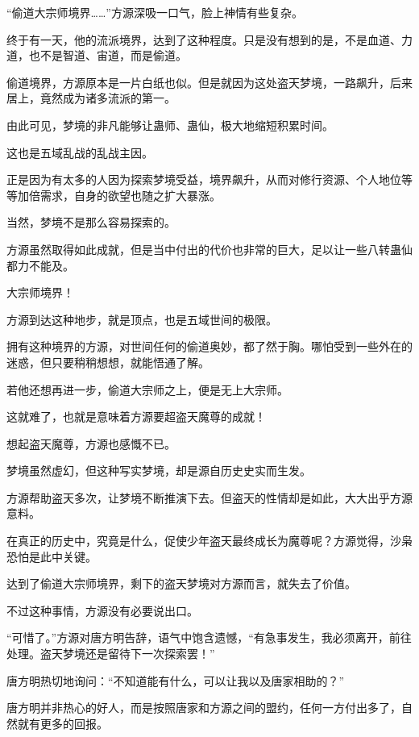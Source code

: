 
\begin{this_body}

“偷道大宗师境界……”方源深吸一口气，脸上神情有些复杂。

终于有一天，他的流派境界，达到了这种程度。只是没有想到的是，不是血道、力道，也不是智道、宙道，而是偷道。

偷道境界，方源原本是一片白纸也似。但是就因为这处盗天梦境，一路飙升，后来居上，竟然成为诸多流派的第一。

由此可见，梦境的非凡能够让蛊师、蛊仙，极大地缩短积累时间。

这也是五域乱战的乱战主因。

正是因为有太多的人因为探索梦境受益，境界飙升，从而对修行资源、个人地位等等加倍需求，自身的欲望也随之扩大暴涨。

当然，梦境不是那么容易探索的。

方源虽然取得如此成就，但是当中付出的代价也非常的巨大，足以让一些八转蛊仙都力不能及。

大宗师境界！

方源到达这种地步，就是顶点，也是五域世间的极限。

拥有这种境界的方源，对世间任何的偷道奥妙，都了然于胸。哪怕受到一些外在的迷惑，但只要稍稍想想，就能悟通了解。

若他还想再进一步，偷道大宗师之上，便是无上大宗师。

这就难了，也就是意味着方源要超盗天魔尊的成就！

想起盗天魔尊，方源也感慨不已。

梦境虽然虚幻，但这种写实梦境，却是源自历史史实而生发。

方源帮助盗天多次，让梦境不断推演下去。但盗天的性情却是如此，大大出乎方源意料。

在真正的历史中，究竟是什么，促使少年盗天最终成长为魔尊呢？方源觉得，沙枭恐怕是此中关键。

达到了偷道大宗师境界，剩下的盗天梦境对方源而言，就失去了价值。

不过这种事情，方源没有必要说出口。

“可惜了。”方源对唐方明告辞，语气中饱含遗憾，“有急事发生，我必须离开，前往处理。盗天梦境还是留待下一次探索罢！”

唐方明热切地询问：“不知道能有什么，可以让我以及唐家相助的？”

唐方明并非热心的好人，而是按照唐家和方源之间的盟约，任何一方付出多了，自然就有更多的回报。


\end{this_body}
